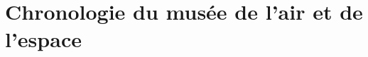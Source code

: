\documentclass[12pt,twoside]{book}
\begin{document}
\chapter[Chronologie du MAE]{Chronologie du musée de l'air et de l'espace}



\newpage{\pagestyle{empty}\cleardoublepage}



\backmatter %



\printglossaries




\tableofcontents


\end{document}
